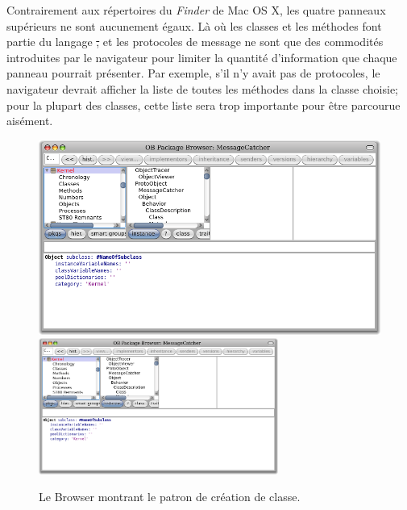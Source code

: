 \documentclass[a4paper,10pt,twoside]{book}
\begin{document}
Contrairement aux r\'epertoires du \emph{Finder} de Mac OS X, les quatre panneaux sup\'erieurs ne sont aucunement \'egaux.
L\`a o\`u les classes et les m\'ethodes font partie du langage \st,
 et les protocoles de message ne sont que des commodités
introduites par le navigateur pour limiter la quantit\'e d'information que chaque panneau pourrait pr\'esenter.
Par exemple, s'il n'y avait pas de protocoles, le navigateur devrait afficher
la liste de toutes les m\'ethodes dans la classe choisie; pour la plupart des classes, cette liste sera trop importante pour \^etre parcourue ais\'ement.


\begin{figure}[htbp]
   \centering
   \ifluluelse
	   {\includegraphics[width=\textwidth]{SystemBrowserClassCreation}}
	   {\includegraphics[width=0.7\textwidth]{SystemBrowserClassCreation}}
   \caption{Le Browser montrant le patron de cr\'eation de classe.
   }
\end{figure}
\end{document}
